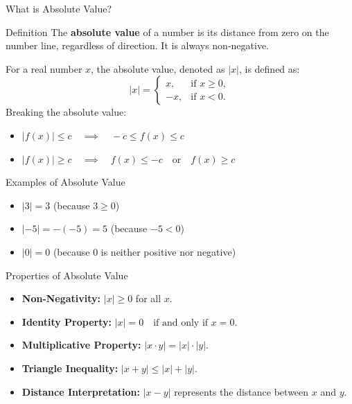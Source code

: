 \documentclass{beamer}
\begin{document}
\begin{frame}{What is Absolute Value?}
  \begin{block}{Definition}
      The \textbf{absolute value} of a number is its distance from zero on the number line, regardless of direction. It is always non-negative.
  \end{block}
  \vspace{10pt}
  For a real number \(x\), the absolute value, denoted as \(|x|\), is defined as:
  \[
  |x| =
  \begin{cases} 
  x, & \text{if } x \geq 0, \\
  -x, & \text{if } x < 0.
  \end{cases}
  \]
Breaking the absolute value: 
  \begin{itemize}
    \item \( |f(x)| \leq c \quad \implies \quad -c \leq f(x) \leq c \)
    \item \( |f(x)| \geq c \quad \implies \quad f(x) \leq -c \quad \text{or} \quad f(x) \geq c \)
\end{itemize}
\end{frame}
\begin{frame}{Examples of Absolute Value}
  \begin{itemize}
      \item \(|3| = 3\) \quad (because \(3 \geq 0\))
      \item \(|-5| = -(-5) = 5\) \quad (because \(-5 < 0\))
      \item \(|0| = 0\) \quad (because \(0\) is neither positive nor negative)
  \end{itemize}
\end{frame}
\begin{frame}{Properties of Absolute Value}
  \begin{itemize}
      \item \textbf{Non-Negativity:} \(|x| \geq 0\) for all \(x\).
      \item \textbf{Identity Property:} \(|x| = 0 \quad \text{if and only if } x = 0.\)
      \item \textbf{Multiplicative Property:} \(|x \cdot y| = |x| \cdot |y|\).
      \item \textbf{Triangle Inequality:} \(|x + y| \leq |x| + |y|\).
      \item \textbf{Distance Interpretation:} \(|x - y|\) represents the distance between \(x\) and \(y\).
  \end{itemize}
\end{frame}
\end{document}
